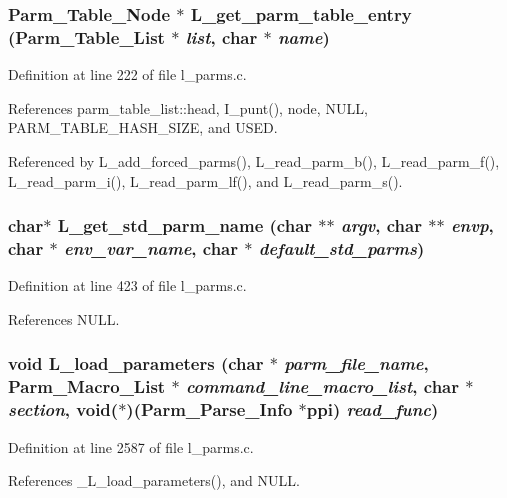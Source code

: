 \subsubsection{\setlength{\rightskip}{0pt plus 5cm}\bf{Parm\_\-Table\_\-Node} $\ast$ L\_\-get\_\-parm\_\-table\_\-entry (\bf{Parm\_\-Table\_\-List} $\ast$ {\em list}, char $\ast$ {\em name})}\label{l__parms_8c_aaa6fc5fe57512c37755e5316453c0fa}




Definition at line 222 of file l\_\-parms.c.

References parm\_\-table\_\-list::head, I\_\-punt(), node, NULL, PARM\_\-TABLE\_\-HASH\_\-SIZE, and USED.

Referenced by L\_\-add\_\-forced\_\-parms(), L\_\-read\_\-parm\_\-b(), L\_\-read\_\-parm\_\-f(), L\_\-read\_\-parm\_\-i(), L\_\-read\_\-parm\_\-lf(), and L\_\-read\_\-parm\_\-s().
\subsubsection{\setlength{\rightskip}{0pt plus 5cm}char$\ast$ L\_\-get\_\-std\_\-parm\_\-name (char $\ast$$\ast$ {\em argv}, char $\ast$$\ast$ {\em envp}, char $\ast$ {\em env\_\-var\_\-name}, char $\ast$ {\em default\_\-std\_\-parms})}\label{l__parms_8c_388daec74010abed75e1a0530d065c97}




Definition at line 423 of file l\_\-parms.c.

References NULL.
\subsubsection{\setlength{\rightskip}{0pt plus 5cm}void L\_\-load\_\-parameters (char $\ast$ {\em parm\_\-file\_\-name}, \bf{Parm\_\-Macro\_\-List} $\ast$ {\em command\_\-line\_\-macro\_\-list}, char $\ast$ {\em section}, void($\ast$)(\bf{Parm\_\-Parse\_\-Info} $\ast$ppi) {\em read\_\-func})}\label{l__parms_8c_80475b4cf1dc53921096f8756a16b542}




Definition at line 2587 of file l\_\-parms.c.

References \_\-L\_\-load\_\-parameters(), and NULL.
